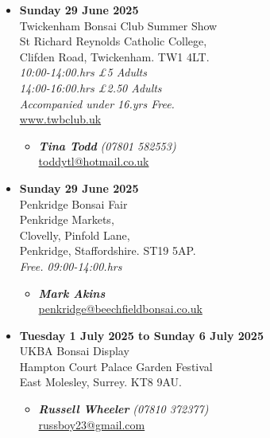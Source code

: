 \begin{itemize}
    \item \textbf{Sunday 29 June 2025}
    \\
    Twickenham Bonsai Club Summer Show \\
    St Richard Reynolds Catholic College, \\
    Clifden Road, Twickenham. TW1 4LT.
    \\
    \emph{10:00-14:00.hrs £5 Adults} \\
    \emph{14:00-16:00.hrs £2.50 Adults} \\
    \emph{Accompanied under 16.yrs Free.}
    \\
    \href{https://www.twbclub.uk}{www.twbclub.uk}
    \begin{itemize}
        \item \textbf{\emph{Tina Todd}} \emph{(07801 582553)} \\
        \href{mailto:toddytl@hotmail.co.uk}{toddytl@hotmail.co.uk} 
    \end{itemize}

    \item \textbf{Sunday 29 June 2025}
    \\
    Penkridge Bonsai Fair \\
    Penkridge Markets, \\
    Clovelly, Pinfold Lane, \\
    Penkridge, Staffordshire. ST19 5AP.
    \\
    \emph{Free. 09:00-14:00.hrs}
    \begin{itemize}
        \item \textbf{\emph{Mark Akins}} \\
        \href{mailto:penkridge@beechfieldbonsai.co.uk}{penkridge@beechfieldbonsai.co.uk} 
    \end{itemize}

    \item \textbf{Tuesday 1 July 2025 to Sunday 6 July 2025}
    \\
    UKBA Bonsai Display \\
    Hampton Court Palace Garden Festival \\
    East Molesley, Surrey. KT8 9AU.
    \begin{itemize}
        \item \textbf{\emph{Russell Wheeler}} \emph{(07810 372377)} \\
        \href{mailto:russboy23@gmail.com}{russboy23@gmail.com} 
    \end{itemize}


\end{itemize}
